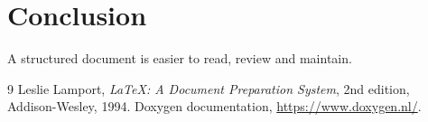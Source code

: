 \documentclass[12pt,a4paper]{report}
\begin{document}
\chapter{Conclusion}
A structured document is easier to read, review and maintain.
\begin{thebibliography}{9}
Leslie Lamport, \textit{LaTeX: A Document Preparation System},
2nd edition, Addison-Wesley, 1994.
Doxygen documentation, \url{https://www.doxygen.nl/}.
\end{thebibliography}
\end{document}

